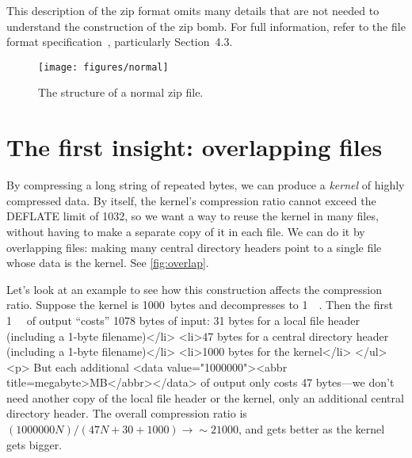 \documentclass[letterpaper,twocolumn,10pt]{article}
\newcommand{\MB}{\mega\byte}
\begin{document}
This description of the zip format omits many details that
are not needed to understand the construction of the zip bomb.
For full information,
refer to the file format specification~\cite{appnote},
particularly Section~4.3.

\begin{figure*}
\texttt{[image: figures/normal]}
\caption{
The structure of a normal zip file.
}
\label{fig:normal}
\end{figure*}


\section{The first insight: overlapping files}
\label{sec:overlap}

By compressing a long string of repeated bytes,
we can produce a \emph{kernel}
of highly compressed data.
By itself, the kernel's compression ratio cannot
exceed the DEFLATE limit of \num{1032},
so we want a way to reuse the kernel in many files,
without having to make a separate copy of it in each file.
We can do it by overlapping files:
making many central directory headers point to
a single file whose data is the kernel.
See \autoref{fig:overlap}.

Let's look at an example to see how this construction affects the compression ratio.
Suppose the kernel is \num{1000}~bytes and
decompresses to \SI{1}{\MB}.
Then the first \SI{1}{\MB} of output ``costs''
\num{1078} bytes of input:
\num{31} bytes for a local file header (including a 1-byte filename)</li>
<li>47 bytes for a central directory header (including a 1-byte filename)</li>
<li>1000 bytes for the kernel</li>
</ul>
<p>
But each additional <data value="1000000"><abbr title=megabyte>MB</abbr></data> of output
only costs 47 bytes—we don't need another copy of the local file header or the kernel,
only an additional central directory header.
The overall compression ratio is
$(\num{1000000} N) / (\num{47} N + 30 + 1000) \rightarrow {\sim}\num{21000}$,
and gets better as the kernel gets bigger.
\end{document}
